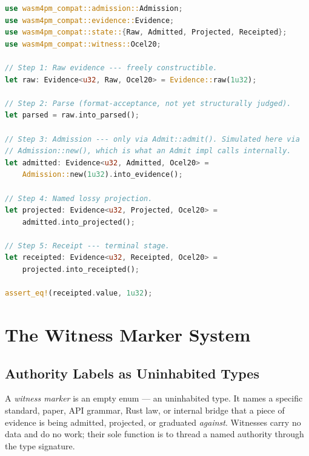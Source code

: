 \begin{lstlisting}[language=Rust, caption={Full lifecycle: \texttt{Raw}
  $\to$ \texttt{Admitted} $\to$ \texttt{Projected} $\to$ \texttt{Receipted}.
  Each transition is a distinct method on a distinct type. None can be
  skipped without a compiler error.}, label={lst:full-lifecycle}]
use wasm4pm_compat::admission::Admission;
use wasm4pm_compat::evidence::Evidence;
use wasm4pm_compat::state::{Raw, Admitted, Projected, Receipted};
use wasm4pm_compat::witness::Ocel20;

// Step 1: Raw evidence --- freely constructible.
let raw: Evidence<u32, Raw, Ocel20> = Evidence::raw(1u32);

// Step 2: Parse (format-acceptance, not yet structurally judged).
let parsed = raw.into_parsed();

// Step 3: Admission --- only via Admit::admit(). Simulated here via
// Admission::new(), which is what an Admit impl calls internally.
let admitted: Evidence<u32, Admitted, Ocel20> =
    Admission::new(1u32).into_evidence();

// Step 4: Named lossy projection.
let projected: Evidence<u32, Projected, Ocel20> =
    admitted.into_projected();

// Step 5: Receipt --- terminal stage.
let receipted: Evidence<u32, Receipted, Ocel20> =
    projected.into_receipted();

assert_eq!(receipted.value, 1u32);
\end{lstlisting}

\section{The Witness Marker System}
\label{sec:arch-witness}

\subsection{Authority Labels as Uninhabited Types}

A \emph{witness marker} is an empty enum --- an uninhabited type. It names
a specific standard, paper, API grammar, Rust law, or internal bridge that a
piece of evidence is being admitted, projected, or graduated \emph{against}.
Witnesses carry no data and do no work; their sole function is to thread a
named authority through the type signature.


